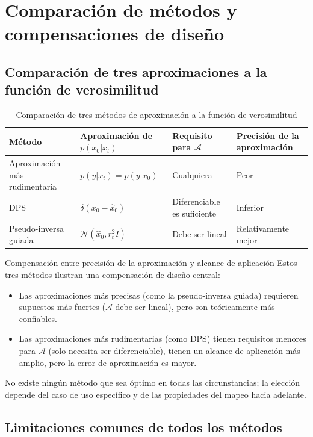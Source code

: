 \section{Comparación de métodos y compensaciones de diseño}

\subsection{Comparación de tres aproximaciones a la función de verosimilitud}

\begin{table}[H]
\centering
\begin{tabular}{p{}p{}p{}p{}}
\toprule
\textbf{Método} & \textbf{Aproximación de $p(x_0|x_t)$} & \textbf{Requisito para $\mathcal{A}$} & \textbf{Precisión de la aproximación} \\
\midrule
Aproximación más rudimentaria & $p(y|x_t) = p(y|x_0)$ & Cualquiera & Peor \\
DPS & $\delta(x_0 - \hat{x}_0)$ & Diferenciable es suficiente & Inferior \\
Pseudo-inversa guiada & $\mathcal{N}(\hat{x}_0, r_t^2 I)$ & Debe ser lineal & Relativamente mejor \\
\bottomrule
\end{tabular}
\caption{Comparación de tres métodos de aproximación a la función de verosimilitud}
\end{table}

\begin{importantbox}{Compensación entre precisión de la aproximación y alcance de aplicación}
Estos tres métodos ilustran una compensación de diseño central:
\begin{itemize}
    \item Las aproximaciones más precisas (como la pseudo-inversa guiada) requieren supuestos más fuertes ($\mathcal{A}$ debe ser lineal), pero son teóricamente más confiables.
    \item Las aproximaciones más rudimentarias (como DPS) tienen requisitos menores para $\mathcal{A}$ (solo necesita ser diferenciable), tienen un alcance de aplicación más amplio, pero la error de aproximación es mayor.
\end{itemize}
No existe ningún método que sea óptimo en todas las circunstancias; la elección depende del caso de uso específico y de las propiedades del mapeo hacia adelante.
\end{importantbox}

\subsection{Limitaciones comunes de todos los métodos}

